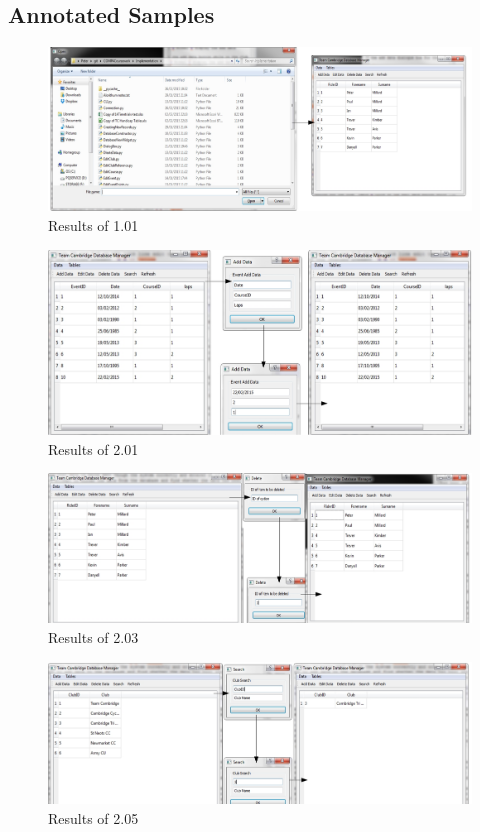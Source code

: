 \begin{landscape}
\section{Annotated Samples}
\begin{figure}[H]
    \includegraphics[width=\textwidth]{./Testing/S3/101.pdf}
    \caption{Results of 1.01} \label{fig:Results of 1.01}
\end{figure}

\begin{figure}[H]
    \includegraphics[width=\textwidth]{./Testing/S3/201.pdf}
    \caption{Results of 2.01} \label{fig:Results of 2.01}
\end{figure}

\begin{figure}[H]
    \includegraphics[width=\textwidth]{./Testing/S3/203.pdf}
    \caption{Results of 2.03} \label{fig:Results of 2.03}
\end{figure}

\begin{figure}[H]
    \includegraphics[width=\textwidth]{./Testing/S3/205.pdf}
    \caption{Results of 2.05} \label{fig:Results of 2.05}
\end{figure}



\end{landscape}

